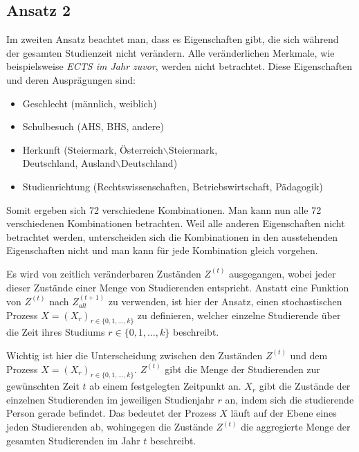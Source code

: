 \subsection{Ansatz 2}
\label{sec:appr2}

Im zweiten Ansatz beachtet man, dass es Eigenschaften gibt, die sich w\"ahrend der gesamten Studienzeit nicht verändern. Alle ver\"anderlichen Merkmale,
wie beispielsweise \textit{ECTS im Jahr zuvor}, werden nicht betrachtet.
Diese Eigenschaften und deren Ausprägungen sind:

\begin{itemize}
  \item Geschlecht (männlich, weiblich)
  \item Schulbesuch (AHS, BHS, andere)
  \item Herkunft (Steiermark, Österreich$\backslash$Steiermark, \\
        Deutschland, Ausland$\backslash$Deutschland)
  \item Studienrichtung (Rechtswissenschaften, Betriebswirtschaft, P\"adagogik)
\end{itemize}

Somit ergeben sich 72 verschiedene Kombinationen. Man kann nun alle 72 verschiedenen
Kombinationen betrachten. Weil alle anderen Eigenschaften nicht betrachtet werden, unterscheiden sich die Kombinationen in den
ausstehenden Eigenschaften nicht und man kann für jede Kombination gleich vorgehen.


Es wird von zeitlich ver\"anderbaren Zuständen $Z^{(t)}$ ausgegangen, wobei jeder dieser
Zustände einer Menge von Studierenden entspricht. Anstatt eine Funktion von $Z^{(t)}$ nach $Z_{alt}^{(t+1)}$
zu verwenden, ist hier der Ansatz, einen stochastischen Prozess $X = (X_r)_{r \in \{ 0,1, \dots, k \} }$ zu definieren, welcher einzelne Studierende \"uber
die Zeit ihres Studiums $r \in \{0,1, \dots , k\}$ beschreibt.

Wichtig ist hier die Unterscheidung zwischen den Zuständen $Z^{(t)}$ und dem Prozess $X = (X_r)_{r \in \{ 0,1, \dots, k \} }$.
$Z^{(t)}$ gibt die Menge der Studierenden zur gewünschten Zeit $t$ ab einem festgelegten Zeitpunkt an.
$X_r$ gibt die Zustände der einzelnen Studierenden im jeweiligen Studienjahr $r$ an, indem sich die studierende Person gerade befindet.
Das bedeutet der Prozess $X$ l\"auft auf der Ebene eines jeden Studierenden ab, wohingegen
die Zust\"ande $Z^{(t)}$ die aggregierte Menge der gesamten Studierenden im Jahr $t$ beschreibt.



